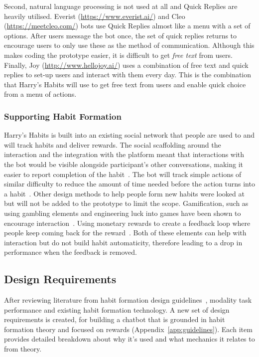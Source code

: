 Second, natural language processing is not used at all and Quick Replies are heavily utilised. Everist (\url{https://www.everist.ai/}) and Cleo (\url{https://meetcleo.com/}) bots use Quick Replies almost like a menu with a set of options. After users message the bot once, the set of quick replies returns to encourage users to only use these as the method of communication. Although this makes coding the prototype easier, it is difficult to get \textit{free text} from users. Finally, Joy (\url{http://www.hellojoy.ai/}) uses a combination of free text and quick replies to set-up users and interact with them every day. This is the combination that Harry's Habits will use to get free text from users and enable quick choice from a menu of actions.


\subsubsection*{Supporting Habit Formation}
Harry's Habits is built into an existing social network that people are used to and will track habits and deliver rewards. The social scaffolding around the interaction and the integration with the platform meant that interactions with the bot would be visible alongside participant's other conversations, making it easier to report completion of the habit~\cite{the_power_of_logging_mobile_notifications}. The bot will track simple actions of similar difficulty to reduce the amount of time needed before the action turns into a habit~\cite{article_how_habits_formed_modelling_habit_formation}. Other design methods to help people form new habits were looked at but will not be added to the prototype to limit the scope. Gamification, such as using gambling elements and engineering luck into games have been shown to encourage interaction~\cite{article_free_to_play_making_money_from_games_you_give_away}. Using monetary rewards to create a feedback loop where people keep coming back for the reward~\cite{website_how_to_design_feedback_loops}. Both of these elements can help with interaction but do not build habit automaticity, therefore leading to a drop in performance when the feedback is removed.



\subsection{Design Requirements} \label{recommendations}
After reviewing literature from habit formation design guidelines~\cite{article_beyond_self_tracking_designing_apps, article_taxonomy_motivational_affordances_meaningful}, modality task performance and existing habit formation technology. A new set of design requirements is created, for building a chatbot that is grounded in habit formation theory and focused on rewards (Appendix~\ref{app:guidelines}). Each item provides detailed breakdown about why it's used and what mechanics it relates to from theory.


